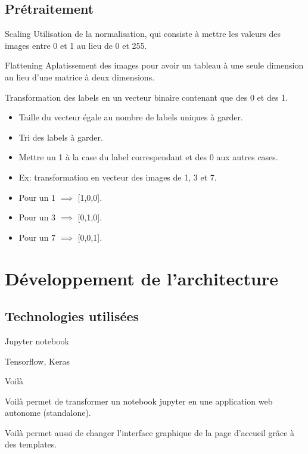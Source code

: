 \documentclass[10pt,handout]{beamer}
\begin{document}
\subsection{Prétraitement}
\begin{block}{Scaling}
    Utilisation de la normalisation, qui consiste à
    mettre les valeurs des images entre 0 et 1 au lieu de 0 et 255.
\end{block}
\begin{block}{Flattening}
    Aplatissement des images pour avoir un tableau à une seule dimension au lieu d’une matrice à deux dimensions.
\end{block}
\begin{block}{}
    Transformation des labels en un vecteur binaire contenant que des 0 et des 1.
    \begin{itemize}
        \item Taille du vecteur égale au nombre de labels uniques à garder.
        \item Tri des labels à garder.
        \item Mettre un 1 à la case du label correspendant
        et des 0 aux autres cases.
        \item Ex: transformation en vecteur des images de 1, 3 et 7.
        \item Pour un 1 $\implies$ [1,0,0].
        \item Pour un 3 $\implies$ [0,1,0].
        \item Pour un 7 $\implies$ [0,0,1].
    \end{itemize}
\end{block}

\section{Développement de l’architecture}
\subsection{Technologies utilisées}
\begin{frame}{Jupyter notebook}
    
\end{frame}

\begin{frame}{Tensorflow, Keras}
    
\end{frame}

\begin{frame}{Voilà}
    \begin{block}{}
        Voilà permet de transformer un
        notebook jupyter en une application web autonome (standalone).
    \end{block}
    \begin{block}{}
        Voilà permet aussi de changer l’interface graphique de la page d’accueil grâce à des templates.
    \end{block}    
\end{frame} 
\end{document}
